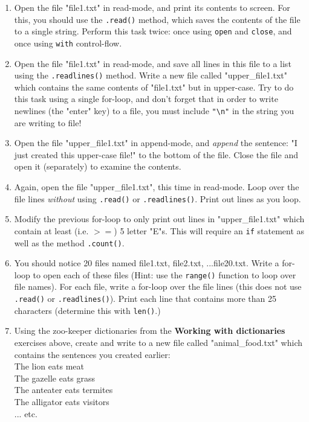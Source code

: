 \documentclass{article}[12pt]
\newcommand{\code}[1]{\texttt{#1}}  %
\begin{document}
\begin{enumerate}
	
	\item Open the file "file1.txt" in read-mode, and print its contents to screen. For this, you should use the \code{.read()} method, which saves the contents of the file to a single string. Perform this task twice: once using \code{open} and \code{close}, and once using \code{with} control-flow.
	
	\item Open the file "file1.txt" in read-mode, and save all lines in this file to a list using the \code{.readlines()} method. Write a new file called "upper\_file1.txt" which contains the same contents of "file1.txt" but in upper-case. Try to do this task using a single for-loop, and don't forget that in order to write newlines (the "enter" key) to a file, you must include \code{"\textbackslash n"} in the string you are writing to file!
	
	\item Open the file "upper\_file1.txt" in append-mode, and \emph{append} the sentence: "I just created this upper-case file!" to the bottom of the file. Close the file and open it (separately) to examine the contents. 
	
	\item Again, open the file "upper\_file1.txt", this time in read-mode. Loop over the file lines \emph{without} using \code{.read()} or \code{.readlines()}. Print out lines as you loop.
	
	\item Modify the previous for-loop to only print out lines in "upper\_file1.txt" which contain at least (i.e. $>=$) 5 letter "E"s. This will require an \code{if} statement as well as the method \code{.count()}.
	
	\item You should notice 20 files named file1.txt, file2.txt, ...file20.txt. Write a for-loop to open each of these files (Hint: use the \code{range()} function to loop over file names). For each file, write a for-loop over the file lines (this does not use \code{.read()} or \code{.readlines()}). Print each line that contains more than 25 characters (determine this with \code{len()}.)
	
	\item Using the zoo-keeper dictionaries from the \textbf{Working with dictionaries} exercises above, create and write to a new file called "animal\_food.txt" which contains the sentences you created earlier: \\
        The lion eats meat \\
        The gazelle eats grass \\ 
        The anteater eats termites \\
        The alligator eats visitors \\ 
            ... etc. \\

\end{enumerate}
\end{document}
